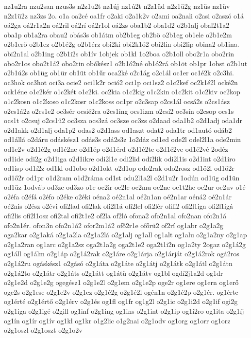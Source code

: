 {nz1u2ra
nzu2san
nzus3s
n2z1u2t
nz1új
nz1ú2t
n2z1üd
n2z1ü2g
nz1üs
nz1üv
n2z1ü2z
nz3zs
2o.
o1a
oa2cé
oa1fr
o2aki
o2a1k2v
o2ami
oa2nali
o2asi
o2aszó
o1á
oá2ga
oá2r1a2n
oá2ril
oá2rí
oá2r1ol
oá2zs
oba1b2
oba1d2
o2b1alj
obal2t1a2
oba1p
ob1a2ra
obau2
obás3s
ob1átm
ob2b1eg
ob2bö
o2b1eg
ob1ele
o2b1e2m
o2b1erő
o2b1ez
o2b1é2g
o2b1érz
obi2ki
obi2k1ó2
obi2lin
obi2lip
obina2
ob1ina.
obi2n1al
o2b1ing
o2b1i2s
ob1ív
1objek
ob1kl
1o2boa
o2b1oll
obo2r1a
obo2rin
obo2r1os
obo2t1á2
obo2tin
obókész1
o2b1ó2né
ob1ó2rá
ob1öt
ob1pr
1obst
o2b1ut
o2b1ú2s
ob1üg
ob1ür
ob1üt
ob1űr
oca2ké
o2c1ág
o2c1ál
oc1er
oc1é2k
o2c3hi.
oc3hok
oc3hot
oci3a
ocie2
oci1k2r
oció2
oci1p
oci1sz2
o1c2kef
oc2k1é2l
ocké2n
ock1éne
o1c2kér
o1c2két
o1c2ki.
oc2kia
o1c2kig
o1c2kin
o1c2kit
o1c2kiv
oc2kop
o1c2kosn
o1c2koso
o1c2kosr
o1c2koss
oc1pr
o2c3sap
o2cs1ál
ocsá2s
o2cs1ász
o2cs1á2z
o2cs1e2
oc3sér
ocsié2ra
o2cs1ing
ocs1izm
o2csí2
oc3sín
o2csop
ocs1s
ocs1t
o2csuj
o2cs1ü2
oc3sza
ocs3zá
oc3sze
oc3zs
o2daad
oda1b2
o2d1adj
oda1dr
o2d1akk
o2d1alj
oda1p2
odas2
o2d1ass
od1aszt
odat2
oda1tr
od1autó
odáb2
od1állá
o2dáru
odáskész1
odás3s
odá2s3z
1o2dáz
od1ed
ode2l
odel2l1a
ode2min
od1e2v
o2d1é2g
od1é2ne
o2d1ép
o2d1érd
o2d1é2te
o2d1é2ve
od1é2vé
2odéz
od1ide
odi2g
o2d1iga
o2d1ikre
odi2l1e
odi2lid
odi2lik
odi2l1is
o2d1int
o2d1iro
od1isp
od1í2z
od1kl
od1obo
o2d1okt
o2d1op
odo2rak
odo2rosz
od1ö2l
od1ö2r
od1ő2r
od1pr
o1d2ram
o1d2ráma
od1st
odu2l1a2l
o2d1u2r
1odún
od1üg
od1ün
od1üz
1odváb
od3ze
od3zo
o1e
oe2ir
oe2le
oe2mu
oe2ne
oe1t2he
oe2ur
oe2uv
o1é
o2éfa
o2éfá
o2éfo
o2éke
o2éki
oéna2
oé2n1al
oé2n1an
oé2n1ar
oéná2
oé2n1ár
oé2nis
o2ész
o2évi
ofi2lad
ofi2lak
ofi2l1á
ofi2lel
ofi2lér
ofili2
ofi2l1iga
ofi2l1igá
ofi2lis
ofi2l1osz
ofi2tal
ofi2t1e2
of2la
of2ló
ofona2
ofo2n1al
ofo2nan
ofo2n1á
ofo2n1ér.
ofon3n
ofo2n1ó2
ofor2m1á2
ofő2r1e
ofőrü2
of2rí
og1abr
o2g1a2g
oga2kar
o2g1aká
o2g1a2la
o2g1a2lá
o2g1alj
og1all
og1alt
og1alu
o2g1a2ny
o2g1ap
o2g1a2ran
og1arc
o2g1a2sz
oga2t1a2g
oga2t1e2
oga2t1i2n
og1a2ty
2ogaz
o2g1á2g
og1áll
og1álm
o2g1áp
o2g1á2rak
o2g1áre
o2g1árja
o2g1árját
o2g1á2rok
ogá2ros
o2g1á2ru
ogáskész1
o2gásó
o2g1áta
o2g1áte
o2g1átj
o2g1átk
o2g1átl
o2g1átn
o2g1á2to
o2g1átr
o2g1áts
o2g1átt
og1átü
o2g1átv
og1bl
ogdí2j1a2d
og1dr
o2g1e2d
o2g1e2g
ogegész1
o2g1e2l
o2g1em
o2g1e2p
oge2r
og1ere
og1ern
og1erő
oge2s
o2g1ese
o2g1e2v
o2g1ez
o2g1é2g
o2g1é2l
ogén1n
o2g1é2p
o2g1ér.
og1érte
og1érté
o2g1értő
o2g1érv
o2g1és
og1fl
og1fr
og1g2l
o2g1ic
o2g1i2d
o2g1if
ogi2g
o2g1iga
o2g1igé
o2gill
og1inf
o2g1ing
og1ins
o2g1int
o2g1ip
og1i2ro
og1ita
o2g1íj
og1ín
og1ír
og1ív
og1kl
og1kr
o1g2lic
o1g2nai
o2g1odv
og1org
og1orr
og1orz
o2g1oszl
o2g1oszt
o2g1o2v
}
